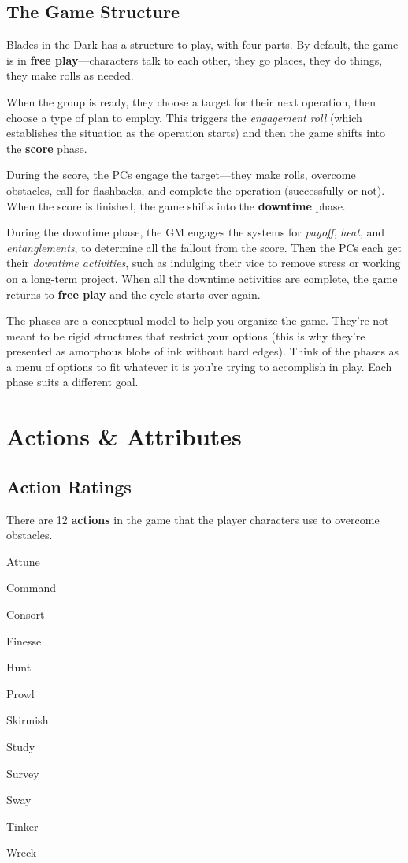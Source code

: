 \subsection{The Game Structure}

Blades in the Dark has a structure to play, with four parts. By default, the game is in \textbf{free play}—characters talk to each other, they go places, they do things, they make rolls as needed.

When the group is ready, they choose a target for their next operation, then choose a type of plan to employ. This triggers the \emph{engagement roll} (which establishes the situation as the operation starts) and then the game shifts into the \textbf{score} phase.

During the score, the PCs engage the target—they make rolls, overcome obstacles, call for flashbacks, and complete the operation (successfully or not). When the score is finished, the game shifts into the \textbf{downtime} phase.

During the downtime phase, the GM engages the systems for \emph{payoff}, \emph{heat}, and \emph{entanglements}, to determine all the fallout from the score. Then the PCs each get their \emph{downtime activities}, such as indulging their vice to remove stress or working on a long-term project. When all the downtime activities are complete, the game returns to \textbf{free play} and the cycle starts over again.

The phases are a conceptual model to help you organize the game. They’re not meant to be rigid structures that restrict your options (this is why they’re presented as amorphous blobs of ink without hard edges). Think of the phases as a menu of options to fit whatever it is you’re trying to accomplish in play. Each phase suits a different goal.

\section{Actions \& Attributes}

\subsection{Action Ratings}

There are 12 \textbf{actions} in the game that the player characters use to overcome obstacles.

\begin{item3}
\item Attune
\item Command
\item Consort
\item Finesse
\item Hunt
\item Prowl
\item Skirmish
\item Study
\item Survey
\item Sway
\item Tinker
\item Wreck
\end{item3}

